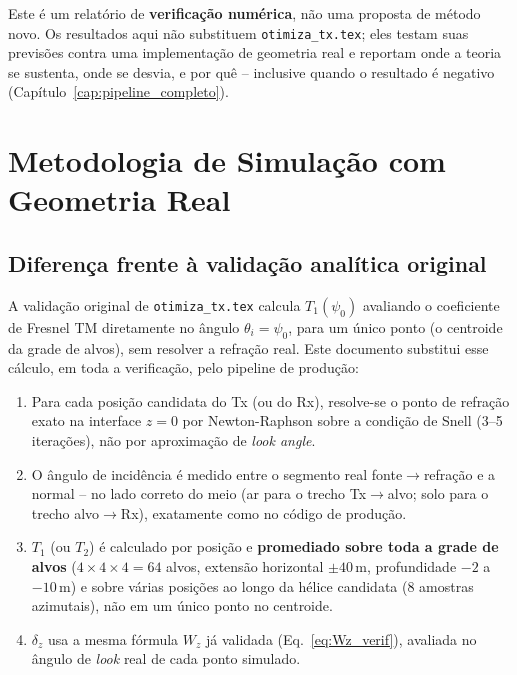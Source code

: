 \documentclass[12pt,a4paper,oneside]{book}
\newcommand{\nota}[2]{%
  \begin{tcolorbox}[enhanced, breakable,
    colback=green!5, colframe=green!50!black,
    fonttitle=\bfseries\small,
    title={\protect#1}]
    #2
  \end{tcolorbox}}
\theoremstyle{definition}
\theoremstyle{remark}
\newcommand{\dz}{\delta_z}
\begin{document}
\nota{Sobre a natureza deste documento}{
Este é um relatório de \textbf{verificação numérica}, não uma proposta de
método novo. Os resultados aqui não substituem \texttt{otimiza\_tx.tex}; eles
testam suas previsões contra uma implementação de geometria real e
reportam onde a teoria se sustenta, onde se desvia, e por quê -- inclusive
quando o resultado é negativo (Capítulo~\ref{cap:pipeline_completo}).
}

\chapter{Metodologia de Simulação com Geometria Real}
\label{cap:metodologia}

\section{Diferença frente à validação analítica original}

A validação original de \texttt{otimiza\_tx.tex} calcula $T_1(\psi_0)$
avaliando o coeficiente de Fresnel TM diretamente no ângulo
$\theta_i=\psi_0$, para um único ponto (o centroide da grade de alvos), sem
resolver a refração real. Este documento substitui esse cálculo, em toda a
verificação, pelo pipeline de produção:

\begin{enumerate}
  \item Para cada posição candidata do Tx (ou do Rx), resolve-se o ponto de
  refração exato na interface $z=0$ por Newton-Raphson sobre a condição de
  Snell (3--5 iterações), não por aproximação de \textit{look angle}.
  \item O ângulo de incidência é medido entre o segmento real
  fonte$\to$refração e a normal -- no lado correto do meio (ar para o
  trecho Tx$\to$alvo; solo para o trecho alvo$\to$Rx), exatamente como no
  código de produção.
  \item $T_1$ (ou $T_2$) é calculado por posição e \textbf{promediado sobre
  toda a grade de alvos} ($4\times4\times4=64$ alvos, extensão horizontal
  $\pm40\,\mathrm{m}$, profundidade $-2$ a $-10\,\mathrm{m}$) e sobre várias
  posições ao longo da hélice candidata (8 amostras azimutais), não em um
  único ponto no centroide.
  \item $\dz$ usa a mesma fórmula $W_z$ já validada
  (Eq.~\eqref{eq:Wz_verif}), avaliada no ângulo de \textit{look} real de
  cada ponto simulado.
\end{enumerate}
\end{document}

